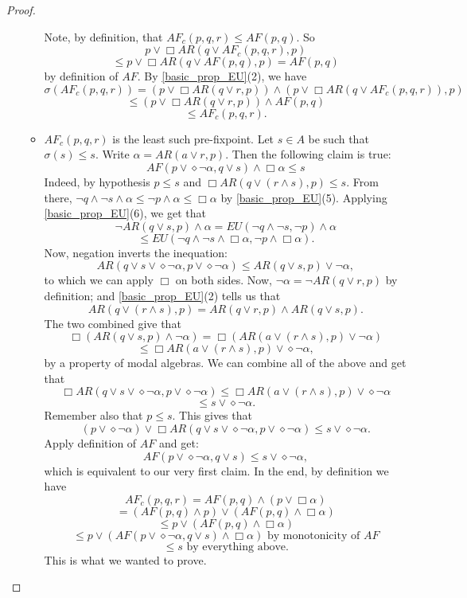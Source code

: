 \documentclass[11pt]{article}
\begin{document}
\begin{proof}
\begin{enumerate}
\begin{itemize}
            Note, by definition, that $AF_c(p,q,r)\leq AF(p,q)$. So \[p\vee\Box AR(q\vee AF_c(p,q,r),p)\]\[\leq p\vee\Box AR(q\vee AF(p,q),p)=AF(p,q)\] by definition of $AF$. By \ref{basic_prop_EU}(2), we have\[\sigma(AF_c(p,q,r))=(p\vee\Box AR(q\vee r,p))\wedge(p\vee\Box AR(q\vee AF_c(p,q,r)),p)\]\[\leq(p\vee\Box AR(q\vee r,p))\wedge AF(p,q)\]\[\leq AF_c(p,q,r).\]
            \item $AF_c(p,q,r)$ is the least such pre-fixpoint. Let $s\in A$ be such that $\sigma(s)\leq s$. Write $\alpha=AR(a\vee r,p)$. Then the following claim is true: \[AF(p\vee\diamond\neg \alpha, q\vee s)\wedge\Box\alpha\leq s\]
            Indeed, by hypothesis $p\leq s$ and $\Box AR(q\vee(r\wedge s),p)\leq s$. From there, $\neg q\wedge \neg s\wedge \alpha \leq \neg p \wedge \alpha\leq\Box\alpha$ by \ref{basic_prop_EU}(5). Applying \ref{basic_prop_EU}(6), we get that \[\neg AR(q\vee s,p)\wedge\alpha=EU(\neg q\wedge\neg s,\neg p)\wedge\alpha\]\[\leq EU(\neg q\wedge\neg s\wedge\Box\alpha,\neg p\wedge\Box\alpha).\] Now, negation inverts the inequation: \[AR(q\vee s\vee \diamond\neg\alpha,p\vee\diamond\neg\alpha)\leq AR(q\vee s,p)\vee\neg\alpha,\] to which we can apply $\Box$ on both sides. Now, $\neg\alpha=\neg AR(q\vee r,p)$ by definition; and \ref{basic_prop_EU}(2) tells us that \[AR(q\vee(r\wedge s),p)=AR(q\vee r,p)\wedge AR(q\vee s,p).\] The two combined give that \[\Box (AR(q\vee s,p)\wedge \neg\alpha)=\Box(AR(a\vee (r\wedge s),p)\vee\neg\alpha)\]\[\leq \Box AR(a\vee (r\wedge s),p)\vee\diamond\neg\alpha,\] by a property of modal algebras. We can combine all of the above and get that\[\Box AR(q\vee s\vee \diamond\neg\alpha,p\vee\diamond\neg\alpha)\leq \Box AR(a\vee (r\wedge s),p)\vee\diamond\neg\alpha\]\[\leq s\vee\diamond\neg\alpha.\] Remember also that $p\leq s$. This gives that \[(p\vee\diamond\neg\alpha)\vee\Box AR(q\vee s\vee \diamond\neg\alpha,p\vee\diamond\neg\alpha)\leq s\vee\diamond\neg\alpha.\] Apply definition of $AF$ and get: \[AF(p\vee\diamond\neg\alpha,q\vee s)\leq s\vee\diamond\neg\alpha,\] which is equivalent to our very first claim. In the end, by definition we have \[AF_c(p,q,r)=AF(p,q)\wedge(p\vee\Box\alpha)\]\[=(AF(p,q)\wedge p)\vee(AF(p,q)\wedge\Box\alpha)\]\[\leq p\vee (AF(p,q)\wedge\Box\alpha)\]\[\leq p\vee (AF(p\vee\diamond\neg\alpha,q\vee s)\wedge\Box\alpha)\mbox{ by monotonicity of }AF\]\[\leq s \mbox{ by everything above.}\] This is what we wanted to prove.
        \end{itemize}
    \end{enumerate}
\end{proof}
\end{document}
